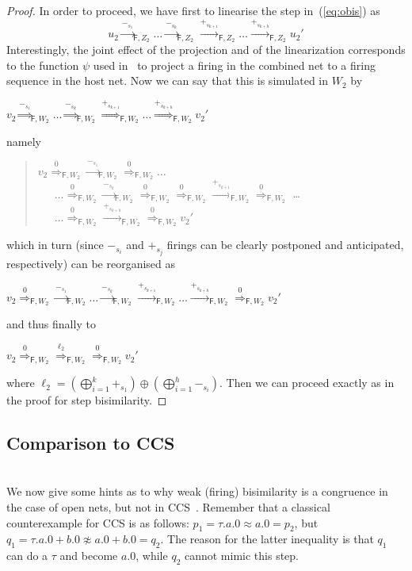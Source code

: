 \documentclass{LMCS}
\newcommand{\ltr}[3][x]{\ensuremath{\stackrel{{#3}}{\longrightarrow}_{\mathsf{#1},#2}}}
\newcommand{\Ltr}[3][x]{\ensuremath{\stackrel{{#3}}{\Longrightarrow}_{\mathsf{#1},#2}}}
\begin{document}
\begin{proof}
In order to proceed, we have first to linearise the step in~(\ref{eq:obis}) as
\begin{equation}
  u_2 \ltr[F]{Z_2}{-_{s_1}} \ldots \ltr[F]{Z_2}{-_{s_k}} \ltr[F]{Z_2}{+_{s_{k+1}}}  \ldots \ltr[F]{Z_2}{+_{s_{k+h}}} u_2'
\end{equation}
Interestingly, the joint effect of the projection and of the
linearization corresponds to the function $\psi$ used
in~\cite[page~96]{v:modular-petri} to project a firing in the combined
net to a firing sequence in the host net.
Now we can say that this is simulated in $W_2$ by 
\begin{center}
  $v_2 \Ltr[F]{W_2}{-_{s_1}} \ldots \Ltr[F]{W_2}{-_{s_k}} \Ltr[F]{W_2}{+_{s_{k+1}}}  \ldots \Ltr[F]{W_2}{+_{s_{k+h}}} v_2'$
\end{center}
namely
\begin{quote}
  $v_2 \Ltr[F]{W_2}{0} \ltr[F]{W_2}{-_{s_1}} \Ltr[F]{W_2}{0} \ldots$\\
  \mbox{} \ \ \ $\ldots \Ltr[F]{W_2}{0} \ltr[F]{W_2}{-_{s_k}} \Ltr[F]{W_2}{0} \Ltr[F]{W_2}{0} \ltr[F]{W_2}{+_{s_{k+1}}} \Ltr[F]{W_2}{0}$  \ldots\\
  \mbox{} \ \ \ $\ldots \Ltr[F]{W_2}{0} \ltr[F]{W_2}{+_{s_{k+h}}} \Ltr[F]{W_2}{0} v_2'$
\end{quote}
which in turn (since $-_{s_i}$ and $+_{s_j}$ firings can be clearly
postponed and anticipated, respectively) can be reorganised as
\begin{center}
  $v_2 \Ltr[F]{W_2}{0} \ltr[F]{W_2}{-_{s_1}} \ldots \ltr[F]{W_2}{-_{s_k}} \ltr[F]{W_2}{+_{s_{k+1}}}  \ldots \ltr[F]{W_2}{+_{s_{k+h}}} \Ltr[F]{W_2}{0} v_2'$
\end{center}
and thus finally to
\begin{center}
  $v_2 \Ltr[F]{W_2}{0} \Ltr[F]{W_2}{\ell_2} \Ltr[F]{W_2}{0} v_2'$
\end{center}
where $\ell_2 = (\bigoplus_{i=1}^k +_{s_1}) \oplus (\bigoplus_{i=1}^h
-_{s_i})$. Then we can proceed exactly as in the proof for step bisimilarity.
\end{proof}



\subsection{Comparison to CCS}
\ \\

\noindent
We now give some hints as to why weak (firing) bisimilarity is a congruence in
the case of open nets, but not in CCS~\cite{Mil:CCS}.  Remember that a
classical counterexample for CCS is as follows: $p_1 = \tau.a.0
\approx a.0 = p_2$, but $q_1 = \tau.a.0 + b.0 \not\approx a.0 + b.0 =
q_2$. The reason for the latter inequality is that $q_1$ can do a
$\tau$ and become $a.0$, while $q_2$ cannot mimic this step.
\end{document}
